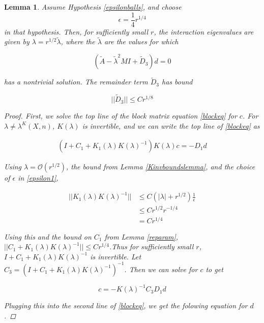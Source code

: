 \documentclass[12pt]{article}
\newtheorem{lemma}{Lemma}
\begin{document}
\begin{lemma}\label{deqlemma}
Assume Hypothesis \ref{epsilonballs}, and choose 
\begin{equation}\label{epsilon1}
\epsilon = \frac{1}{4}r^{1/4}
\end{equation}
in that hypothesis. Then, for sufficiently small $r$, the interaction eigenvalues are given by $\lambda = r^{1/2} \tilde{\lambda}$, where the $\tilde{\lambda}$ are the values for which

\begin{equation}\label{eqford}
(\tilde{A} - \tilde{\lambda}^2 MI + \tilde{D}_3)d = 0
\end{equation}

has a nontrivial solution. The remainder term $\tilde{D}_3$ has bound

\begin{equation}\label{tildeD3bound}
||\tilde{D}_3|| \leq C r^{1/8}
\end{equation}

\begin{proof}
First, we solve the top line of the block matrix equation \eqref{blockeq} for $c$. For $\lambda \neq \lambda^K(X, n)$, $K(\lambda)$ is invertible, and we can write the top line of \eqref{blockeq} as

\begin{align*}
(I + C_1 + K_1(\lambda)K(\lambda)^{-1}) K(\lambda) c = -D_1 d
\end{align*}

Using $\lambda = \mathcal{O}(r^{1/2})$, the bound from Lemma \ref{Kinvboundslemma}, and the choice of $\epsilon$ in \eqref{epsilon1},

\begin{align*}
||K_1(\lambda)K(\lambda)^{-1}|| &\leq C (|\lambda| + r^{1/2})\frac{1}{\epsilon} \\
&\leq C r^{1/2} r^{-1/4} \\
&= C r^{1/4}
\end{align*}

Using this and the bound on $C_1$ from Lemma \ref{reparam}, $||C_1 + K_1(\lambda)K(\lambda)^{-1}|| \leq C r^{1/4}$.Thus for sufficiently small $r$, $I + C_1 + K_1(\lambda)K(\lambda)^{-1}$ is invertible. Let $C_3 = (I + C_1 + K_1(\lambda)K(\lambda)^{-1})^{-1}$. Then we can solve for $c$ to get

\[
c = -K(\lambda)^{-1} C_3 D_1 d
\]

Plugging this into the second line of \eqref{blockeq}, we get the folowing equation for $d$.


\end{proof}
\end{lemma}
\end{document}
